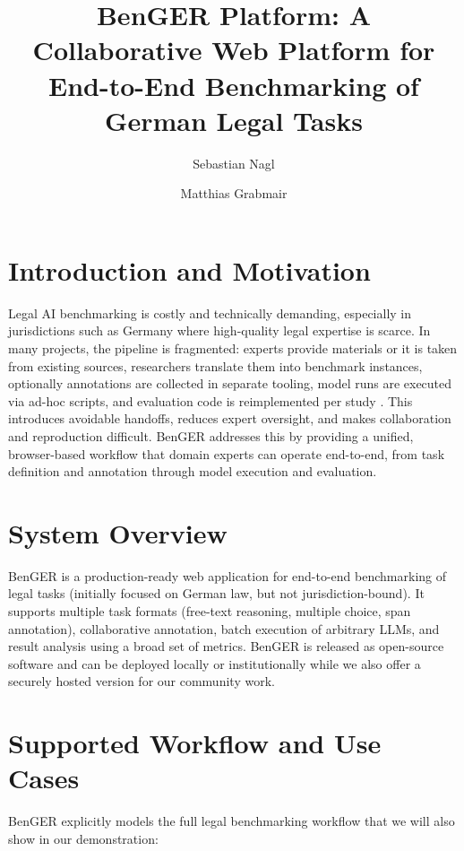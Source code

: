 \documentclass[sigconf]{acmart}
\title{ BenGER Platform: A Collaborative Web Platform for End-to-End Benchmarking of German Legal Tasks}
\author{Sebastian Nagl}
\affiliation{
  \institution{Technical University of Munich}
  \city{Munich}
  \country{Germany}
}
\author{Matthias Grabmair}
\affiliation{
  \institution{Technical University of Munich}
  \city{Munich}
  \country{Germany}
}
\begin{document}
\maketitle

\section{Introduction and Motivation}
Legal AI benchmarking is costly and technically demanding, especially in jurisdictions such as Germany where high-quality legal expertise is scarce. In many projects, the pipeline is fragmented: experts provide materials or it is taken from existing sources, researchers translate them into benchmark instances, optionally annotations are collected in separate tooling, model runs are executed via ad-hoc scripts, and evaluation code is reimplemented per study \citep{fan2025, guha2022}. This introduces avoidable handoffs, reduces expert oversight, and makes collaboration and reproduction difficult.
BenGER addresses this by providing a unified, browser-based workflow that domain experts can operate end-to-end, from task definition and annotation through model execution and evaluation.

\section{System Overview}
BenGER is a production-ready web application for end-to-end benchmarking of legal tasks (initially focused on German law, but not jurisdiction-bound). It supports multiple task formats (free-text reasoning, multiple choice, span annotation), collaborative annotation, batch execution of arbitrary LLMs, and result analysis using a broad set of metrics. BenGER is released as open-source software and can be deployed locally or institutionally while we also offer a securely hosted version for our community work.

\section{Supported Workflow and Use Cases}

BenGER explicitly models the full legal benchmarking workflow that we will also show in our demonstration:
\end{document}
